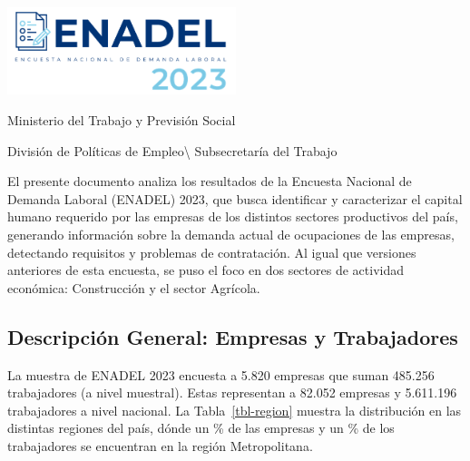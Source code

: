 \documentclass[
  11pt,
]{article}
\author{}
\date{}
\renewcommand*\contentsname{Tabla de contenidos}
\newcommand\contentsname{Tabla de contenidos}
\begin{document}



\newpage

\thispagestyle{empty}

\centering

\includegraphics[width=0.5\textwidth]{../Logotipo ENADEL/logotipo-ENADEL-2023.png}
\vspace{2cm}

\noindent Ministerio del Trabajo y Previsión Social

División de Políticas de Empleo\textbackslash{} Subsecretaría del
Trabajo

\justifying

El presente documento analiza los resultados de la Encuesta Nacional de
Demanda Laboral (ENADEL) 2023, que busca identificar y caracterizar el
capital humano requerido por las empresas de los distintos sectores
productivos del país, generando información sobre la demanda actual de
ocupaciones de las empresas, detectando requisitos y problemas de
contratación. Al igual que versiones anteriores de esta encuesta, se
puso el foco en dos sectores de actividad económica: Construcción y el
sector Agrícola.

\newpage
\renewcommand{\contentsname}{Índice} 
\tableofcontents

\newpage

\subsection{Descripción General: Empresas y
Trabajadores}\label{descripciuxf3n-general-empresas-y-trabajadores}

La muestra de ENADEL 2023 encuesta a 5.820 empresas que suman 485.256
trabajadores (a nivel muestral). Estas representan a 82.052 empresas y
5.611.196 trabajadores a nivel nacional. La Tabla~\ref{tbl-region}
muestra la distribución en las distintas regiones del país, dónde un
\% de las empresas y un \% de los trabajadores se
encuentran en la región Metropolitana.

\vspace{5mm}

\FloatBarrier
\end{document}
